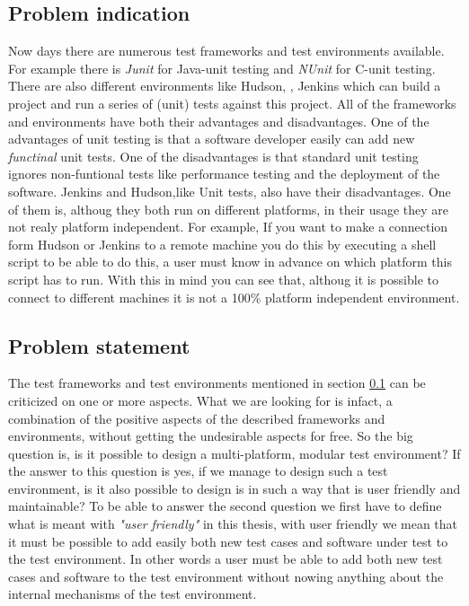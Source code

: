 \documentclass[a4paper,10pt]{scrartcl}
\newcommand{\CS}{C\nolinebreak\hspace{-.05em}\raisebox{.6ex}{\bf \#}}
\begin{document}
\subsection{Problem indication}
\label{subsec:Problemindication}
Now days there are numerous test frameworks and test environments available. For example there is \emph{Junit}\cite{Junit} for Java-unit testing and \emph{NUnit}\cite{Nunit} for \CS{}-unit testing.
There are also different environments like Hudson\cite{HudsonDoc}, \cite{Hudson}, Jenkins\cite{JenkinsDoc} which can build a project and run a series of (unit) tests against this project. 
All of the frameworks and environments have both their advantages and disadvantages. One of the advantages of unit testing is that a software developer easily can add new \emph{functinal} unit tests.
One of the disadvantages is that standard unit testing ignores non-funtional tests like performance testing and the deployment of the software. Jenkins and Hudson,like Unit tests, also have their
disadvantages. One of them is, althoug they both run on different platforms, in their usage they are not realy platform independent. For example, If you want
to make a connection form Hudson or Jenkins to a remote machine you do this by executing a shell script to be able to do this, a user must know in advance on which platform this script has to run.
With this in mind you can see that, althoug it is possible to connect to different machines it is not a 100\% platform independent environment.
 
\subsection{Problem statement}
\label{subsec:Problemstatement}
The test frameworks and test environments mentioned in section \ref{subsec:Problemindication} can be criticized on one or more aspects. What we are looking for is infact, a combination
of the positive aspects of the described frameworks and environments, without getting the undesirable aspects for free. So the big question is, is it possible to design a
multi-platform, modular test environment? If the answer to this question is yes, if we manage to design such a test environment, is it also possible to design is in such a way
that is user friendly and maintainable? To be able to answer the second question we first have to define what is meant with \emph{"user friendly"} in this thesis,
with user friendly we mean that it must be possible to add easily both new test cases and software under test to the test environment. In other words a user must be able
to add both new test cases and software to the test environment without nowing anything about the internal mechanisms of the test environment.\\
\end{document}
